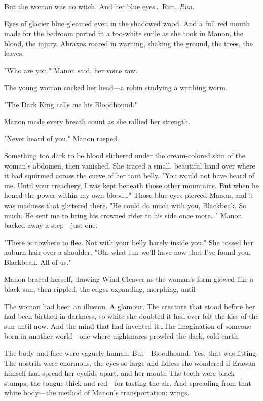 But the woman was no witch.
And her blue eyes\ldots{} Run.
\emph{Run}.

Eyes of glacier blue gleamed even in the shadowed wood.
And a full red mouth made for the bedroom parted in a too-white smile as she took in Manon, the blood, the injury.
Abraxos roared in warning, shaking the ground, the trees, the leaves.

"Who are you," Manon said, her voice raw.

The young woman cocked her head---a robin studying a writhing worm.

"The Dark King calls me his Bloodhound."

Manon made every breath count as she rallied her strength.

"Never heard of you," Manon rasped.

Something too dark to be blood slithered under the cream-colored skin of the woman's abdomen, then vanished.
She traced a small, beautiful hand over where it had squirmed across the curve of her taut belly.
"You would not have heard of me.
Until your treachery, I was kept beneath those other mountains.
But when he honed the power within my own blood\ldots" Those blue eyes pierced Manon, and it was madness that glittered there.
"He could do much with you, Blackbeak.
So much.
He sent me to bring his crowned rider to his side once more\ldots" Manon backed away a step---just one.

"There is nowhere to flee.
Not with your belly barely inside you."
She tossed her auburn hair over a shoulder.
"Oh, what fun we'll have now that I've found you, Blackbeak.
All of us."

Manon braced herself, drawing Wind-Cleaver as the woman's form glowed like a black sun, then rippled, the edges expanding, morphing, until---

The woman had been an illusion.
A glamour.
The creature that stood before her had been birthed in darkness, so white she doubted it had ever felt the kiss of the sun until now.
And the mind that had invented it\ldots The imagination of someone born in another world---one where nightmares prowled the dark, cold earth.

The body and face were vaguely human.
But---Bloodhound.
Yes, that was fitting.
The nostrils were enormous, the eyes so large and lidless she wondered if Erawan himself had spread her eyelids apart, and her mouth  The teeth were black stumps, the tongue thick and red---for tasting the air.
And spreading from that white body---the method of Manon's transportation: wings.


